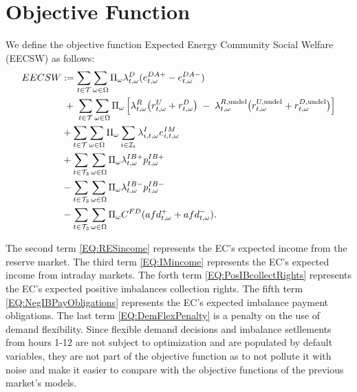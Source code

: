 \documentclass{article}
\begin{document}
\section{Objective Function}
\label{SEC:ObjectiveFunction}

We define the objective function Expected Energy Community Social Welfare (EECSW) as follows:
\begin{subequations}
	\begin{align}
    EECSW & := \sum_{t \in \mathcal{T}} \sum_{\omega \in \Omega} \Pi_{\omega} \lambda^D_{t, \omega} (e^{DA+}_{t, \omega} - e^{DA-}_{t, \omega}) \label{EQ:DAincome} \\
&\;+\;
\sum_{t \in \mathcal{T}}
\sum_{\omega \in \Omega}
    \Pi_{\omega}\,
    \Bigl[
      \lambda^{R}_{t,\omega}
        \bigl(r^{U}_{t,\omega} + r^{D}_{t,\omega}\bigr)
      \;-\;
      \lambda^{R,\text{undel}}_{t,\omega}
        \bigl(r^{U,\text{undel}}_{t,\omega} + r^{D,\text{undel}}_{t,\omega}\bigr)
    \Bigr] \label{EQ:RESincome} \\
		& + \sum_{t \in \mathcal{T}} \sum_{\omega \in \Omega} \Pi_{\omega} \sum_{i \in \mathcal{I}_t} \lambda^{I}_{i, t, \omega} e^{IM}_{i, t, \omega} \label{EQ:IMincome} \\
		& + \sum_{t \in \mathcal{T}_3} \sum_{\omega \in \Omega} \Pi_{\omega} \lambda^{IB+}_{t, \omega} p^{IB+}_{t, \omega} \label{EQ:PosIBcollectRights} \\
		& - \sum_{t \in \mathcal{T}_3} \sum_{\omega \in \Omega} \Pi_{\omega} \lambda^{IB-}_{t, \omega} p^{IB-}_{t, \omega} \label{EQ:NegIBPayObligations} \\
		& - \sum_{t \in \mathcal{T}_3} \sum_{\omega \in \Omega} \Pi_{\omega} C^{FD} (afd^+_{t, \omega} + afd^-_{t, \omega}). \label{EQ:DemFlexPenalty}
	\end{align}
	\label{EQ:EECSW}
\end{subequations}


The second term \eqref{EQ:RESincome} represents the EC's expected income from the reserve market. The third term \eqref{EQ:IMincome} represents the EC's expected income from intraday markets. The forth term \eqref{EQ:PosIBcollectRights} represents the EC's expected positive imbalances collection rights. The fifth term \eqref{EQ:NegIBPayObligations} represents the EC's expected imbalance payment obligations. The last term \eqref{EQ:DemFlexPenalty} is a penalty on the use of demand flexibility. Since flexible demand decisions and imbalance setllements from hours 1-12 are not subject to optimization and are populated by default variables, they are not part of the objective function as to not pollute it with noise and make it easier to compare with the objective functions of the previous market's models.
\end{document}
